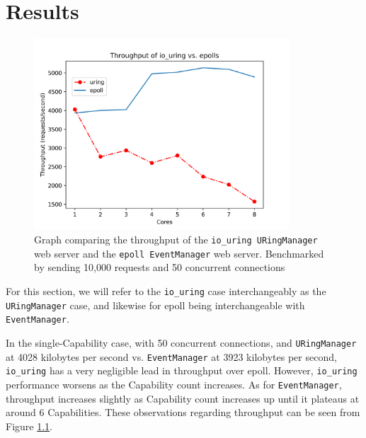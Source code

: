 \chapter{Results}

\begin{figure}[ht]
    \centering
	\includegraphics[width=0.85\textwidth]{figures/graphics/throughput.png}
	\caption[Web Server Throughput]{
		Graph comparing the throughput of the \texttt{io\_uring URingManager} web server
		and the \texttt{epoll EventManager} web server. Benchmarked by sending
		10,000 requests and 50 concurrent connections
	}
	\label{fig:throughput}
\end{figure}

For this section, we will refer to the \texttt{io\_uring} case interchangeably as the \texttt{URingManager} case, and likewise for epoll being interchangeable with \texttt{EventManager}.

In the single-Capability case, with 50 concurrent connections, and \texttt{URingManager} at 4028 kilobytes per second vs. \texttt{EventManager} at 3923 kilobytes per second, \texttt{io\_uring} has a very negligible lead in throughput over epoll. However, \texttt{io\_uring} performance worsens as the Capability count increases. As for \texttt{EventManager}, throughput increases slightly as Capability count increases up until it plateaus at around 6 Capabilities. These observations
regarding throughput can be seen from Figure \ref{fig:throughput}. 

